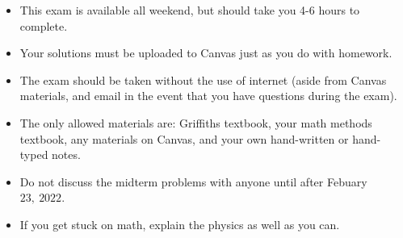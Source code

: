 \documentclass[fleqn]{article}
\begin{document}
  \begin{itemize}
    \item This exam is available all weekend, but should take you 4-6 hours to complete.
    \item Your solutions must be uploaded to Canvas just as you do with homework.
    \item The exam should be taken without the use of internet (aside from Canvas materials, and email
    in the event that you have questions during the exam).
    \item The only allowed materials are: Griffiths textbook, your math methods textbook, any materials
    on Canvas, and your own hand-written or hand-typed notes.
    \item Do not discuss the midterm problems with anyone until after Febuary $23, ~ 2022$.
    \item If you get stuck on math, explain the physics as well as you can.
  \end{itemize}

  \pagebreak
\end{document}
